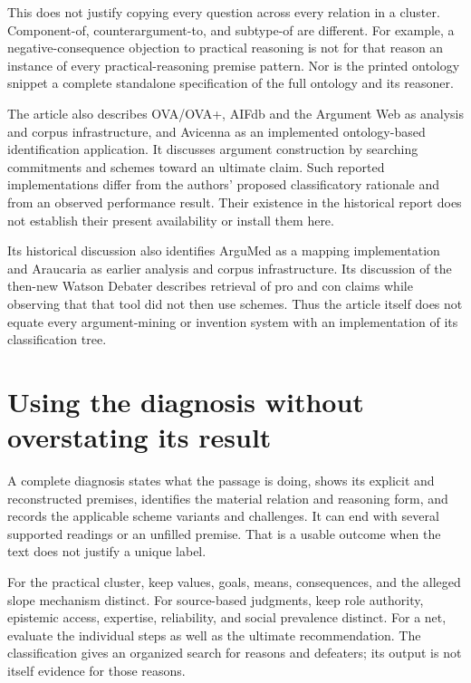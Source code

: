 This does not justify copying every question across every relation
in a cluster. Component-of, counterargument-to, and subtype-of
are different. For example, a negative-consequence objection to
practical reasoning is not for that reason an instance of every
practical-reasoning premise pattern.
Nor is the printed ontology snippet a complete standalone
specification of the full ontology and its reasoner.

The article also describes OVA/OVA+, AIFdb and the Argument Web
as analysis and corpus infrastructure, and Avicenna as an implemented
ontology-based identification application. It discusses argument
construction by searching commitments and schemes toward an
ultimate claim. Such reported implementations differ from the
authors' proposed classificatory rationale and from an observed
performance result. Their existence in the historical report
does not establish their present availability or install them here.

Its historical discussion also identifies ArguMed as a mapping
implementation and Araucaria as earlier analysis and corpus
infrastructure. Its discussion of the then-new Watson Debater
describes retrieval of pro and con claims while observing that
that tool did not then use schemes. Thus the article itself
does not equate every argument-mining or invention system with
an implementation of its classification tree.

\section{Using the diagnosis without overstating its result}

A complete diagnosis states what the passage is doing, shows
its explicit and reconstructed premises, identifies the material
relation and reasoning form, and records the applicable scheme
variants and challenges. It can end with several supported readings
or an unfilled premise. That is a usable outcome when the text
does not justify a unique label.

For the practical cluster, keep values, goals, means, consequences,
and the alleged slope mechanism distinct. For source-based judgments,
keep role authority, epistemic access, expertise, reliability,
and social prevalence distinct. For a net, evaluate the individual
steps as well as the ultimate recommendation.
The classification gives an organized search for reasons and
defeaters; its output is not itself evidence for those reasons.

